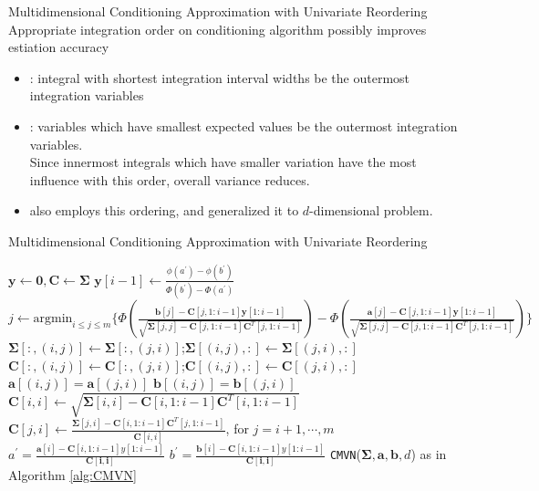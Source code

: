 \begin{frame}{Multidimensional Conditioning Approximation with Univariate Reordering}
Appropriate integration order on conditioning algorithm possibly improves estiation accuracy
\begin{itemize}
	\item \citet{schervish1984algorithm} : integral with shortest integration interval widths be the outermost integration variables
	\item \citet{gibson1994monte} : variables which have smallest expected values be the outermost integration variables.\\
	Since innermost integrals which have smaller variation have the most influence with this order, overall variance reduces.
	\item \citet{trinh2015bivariate} also employs this ordering, and \citet{cao2019hierarchical} generalized it to $d$-dimensional problem.
\end{itemize}
\end{frame}

\begin{frame}{Multidimensional Conditioning Approximation with Univariate Reordering}
\begin{algorithm}[H]
	\caption{d-dimensional conditioning algorithm with univariate reordering}
	\begin{algorithmic}[1]
		\tiny
		\State $\mathbf{y}\leftarrow\mathbf{0},\mathbf{C}\leftarrow\boldsymbol{\Sigma}$
		\State $\mathbf{y}[i-1]\leftarrow\frac{\phi(a^\prime)-\phi(b^\prime)}{\Phi(b^\prime)-\Phi(a^\prime)}$
		\EndIf
		\State $j\leftarrow\text{argmin}_{i\leq j\leq m}\{\Phi(\frac{\mathbf{b}[j]-\mathbf{C}[j,1:i-1]\mathbf{y}[1:i-1]}{\sqrt{\boldsymbol{\Sigma}[j,j]-\mathbf{C}[j,1:i-1]\mathbf{C}^T[j,1:i-1]}})-\Phi(\frac{\mathbf{a}[j]-\mathbf{C}[j,1:i-1]\mathbf{y}[1:i-1]}{\sqrt{\boldsymbol{\Sigma}[j,j]-\mathbf{C}[j,1:i-1]\mathbf{C}^T[j,1:i-1]}})\}$
		\State $\boldsymbol{\Sigma}[:,(i,j)]\leftarrow\boldsymbol{\Sigma}[:,(j,i)]$;$\boldsymbol{\Sigma}[(i,j),:]\leftarrow\boldsymbol{\Sigma}[(j,i),:]$
		\State $\mathbf{C}[:,(i,j)]\leftarrow\mathbf{C}[:,(j,i)]$;$\mathbf{C}[(i,j),:]\leftarrow\mathbf{C}[(j,i),:]$
		\State $\mathbf{a}[(i,j)]=\mathbf{a}[(j,i)]$
		\State $\mathbf{b}[(i,j)]=\mathbf{b}[(j,i)]$
		\State $\mathbf{C}[i,i]\leftarrow\sqrt{\boldsymbol{\Sigma}[i,i]-\mathbf{C}[i,1:i-1]\mathbf{C}^T[i,1:i-1]}$
		\State $\mathbf{C}[j,i]\leftarrow \frac{\boldsymbol{\Sigma}[j,i]-\mathbf{C}[i,1:i-1]\mathbf{C}^T[j,1:i-1]}{\mathbf{C}[i,i]}$, for $j=i+1,\cdots,m$
		\State $a^\prime=\frac{\mathbf{a}[i]-\mathbf{C}[i,1:i-1]y[1:i-1]}{\mathbf{C[i,i]}}$
		\State $b^\prime=\frac{\mathbf{b}[i]-\mathbf{C}[i,1:i-1]y[1:i-1]}{\mathbf{C[i,i]}}$
		\EndFor
		\State\Return \texttt{CMVN}($\boldsymbol{\Sigma},\mathbf{a},\mathbf{b},d$) as in Algorithm \ref{alg:CMVN}
		\EndProcedure
	\end{algorithmic}\label{alg:RCMVN}
\end{algorithm}

\end{frame}